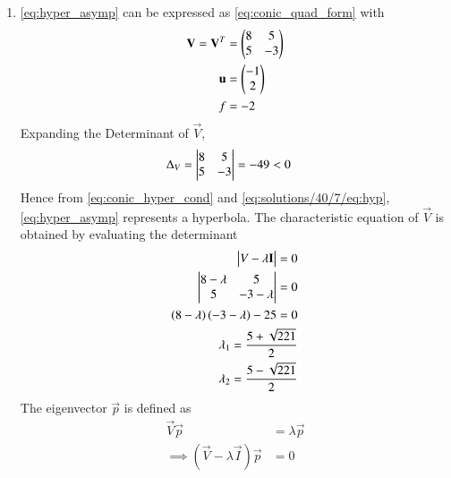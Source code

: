 \begin{enumerate}
\item  \eqref{eq:hyper_asymp} can be expressed as \eqref{eq:conic_quad_form} with 
\begin{align}
    \mathbf{V}=\mathbf{V}^T&=\begin{pmatrix}8 & 5 \\ 5 &-3\end{pmatrix}\label{eq:solutions/40/7/eqv}\\
    \mathbf{u}&=\begin{pmatrix}-1 \\2 \end{pmatrix}\label{eq:solutions/40/7/equ}\\
    f&=-2\label{eq:solutions/40/7/eqfv}
\end{align}   
Expanding the Determinant of $\vec{V}$,
\begin{align}
    \Delta_{V} &= \begin{vmatrix}
8 &5
\\
5 & -3
\end{vmatrix}
= -49 < 0
\label{eq:solutions/40/7/eq:hyp}
\end{align}
Hence from \eqref{eq:conic_hyper_cond} and \eqref{eq:solutions/40/7/eq:hyp}, \eqref{eq:hyper_asymp}
represents a hyperbola.
The characteristic equation of $\vec{V}$ is obtained by evaluating the determinant 
\begin{align}
\begin{vmatrix}V-\lambda\mathbf{I}\end{vmatrix} = 0
\\
\begin{vmatrix}
8-\lambda & 5 \\ 5 & -3-\lambda
\end{vmatrix} = 0
\\
    \left(8-\lambda\right)\left(-3-\lambda\right)-25=0\\
    \lambda_{1}= \frac{5+\sqrt{221}}{2}\label{eq:solutions/40/7/eq:matrix_l1}\\
    \lambda_{2}= \frac{5-\sqrt{221}}{2}\label{eq:solutions/40/7/eq:matrix_l2}
\end{align}
The eigenvector $\vec{p}$ is defined as 
\begin{align}
    \vec{V}\vec{p}&=\lambda\vec{p}\\
    \implies (\vec{V}-\lambda\vec{I})\vec{p}&=0\label{eq:solutions/40/7/eq:7/eqev}
\end{align}

\end{enumerate}
